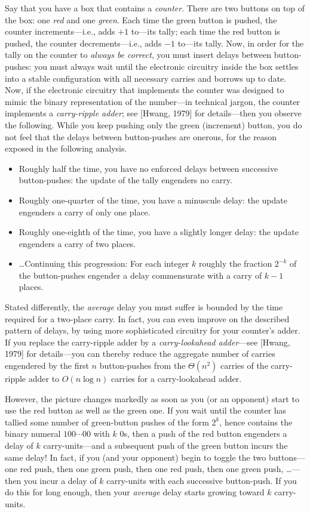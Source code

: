 \noindent
Say that you have a box that contains a {\it counter}.  There are two buttons on top of the box: one {\em red} and one {\em green}.  Each time the green button is pushed, the counter increments---i.e., adds $+1$ to---its tally; each time the red button is pushed, the counter
decrements---i.e., adds $-1$ to---its tally.  Now, in order for the tally on the counter to {\em always be correct}, you must insert delays between button-pushes: you must always wait until the
electronic circuitry inside the box settles into a stable configuration with all necessary carries and borrows up to date.  Now, if the electronic circuitry that implements the counter was designed to mimic the binary representation of the number---in technical jargon,  the counter implements a {\it carry-ripple adder}; see [Hwang, 1979] for details---then you observe the following.  While you keep pushing only the green (increment) button, you do not feel that the delays between
button-pushes are onerous, for the reason exposed in the following analysis.
\begin{itemize}
\item
Roughly half the time, you have no enforced delays between successive button-pushes: the update of the tally engenders no carry.
\item
Roughly one-quarter of the time, you have a minuscule delay: the update engenders a carry of only one place.
\item
Roughly one-eighth of the time, you have a slightly longer delay: the update engenders a carry of two places.
\item
\ldots Continuing this progression: For each integer $k$ roughly the fraction $2^{-k}$ of the button-pushes engender a delay commensurate with a carry of $k-1$ places.
\end{itemize}
Stated differently, the {\em average} delay you must suffer is bounded by the time required for a two-place carry.  In fact, you can even improve on the described pattern of delays, by using more
sophisticated circuitry for your counter's adder.  If you replace the carry-ripple adder by a {\it carry-lookahead adder}---see [Hwang, 1979] for details---you can thereby reduce the aggregate
number of carries engendered by the first $n$ button-pushes from the $\Theta(n^2)$ carries of the carry-ripple adder to $O(n \log n)$ carries for a carry-lookahead adder.

\smallskip

However, the picture changes markedly as soon as you (or an opponent) start to use the red button as well as the green one.  If you wait until the counter has tallied some number of green-button pushes of the form $2^k$, hence contains the binary numeral $100 \cdots 00$ with $k$ $0$s, then a push of the red button engenders a delay of $k$ carry-units---and a subsequent push of the green button incurs the same delay!  In fact, if you (and your opponent) begin to toggle the two buttons---one red push, then one green push, then one red push, then one green push, \ldots---then you incur a delay of $k$ carry-units with each successive button-push.  If you do this for long enough, then your {\em average} delay starts growing toward $k$ carry-units.


